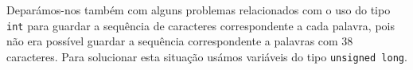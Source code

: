 \documentclass[11pt]{article}
\begin{document}
Deparámos-nos também com alguns problemas relacionados com o uso do tipo \verb|int| para guardar a sequência de caracteres correspondente a cada palavra, pois não era possível guardar a sequência correspondente a palavras com 38 caracteres. Para solucionar esta situação usámos variáveis do tipo \verb|unsigned long|.
\end{document}
